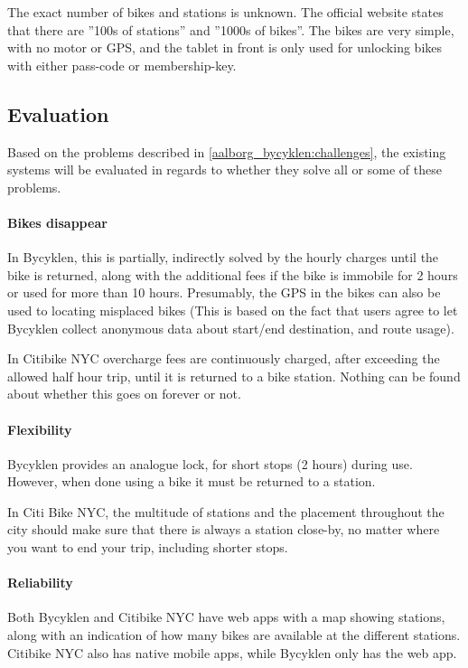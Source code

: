 The exact number of bikes and stations is unknown.
The official website states that there are ''100s of stations'' and ''1000s of bikes''\cite{nyc_citibike}.
The bikes are very simple, with no motor or GPS, and the tablet in front is only used for unlocking bikes with either pass-code or membership-key.

\subsection{Evaluation}
Based on the problems described in \cref{aalborg_bycyklen:challenges}, the existing systems will be evaluated in regards to whether they solve all or some of these problems.

\paragraph{Bikes disappear}
In Bycyklen, this is partially, indirectly solved by the hourly charges until the bike is returned, along with the additional fees if the bike is immobile for 2 hours or used for more than 10 hours.
Presumably, the GPS in the bikes can also be used to locating misplaced bikes (This is based on the fact that users agree to let Bycyklen collect anonymous data about start/end destination, and route usage).

In Citibike NYC overcharge fees are continuously charged, after exceeding the allowed half hour trip, until it is returned to a bike station.
Nothing can be found about whether this goes on forever or not.

\paragraph{Flexibility}
Bycyklen provides an analogue lock, for short stops (2 hours) during use.
However, when done using a bike it must be returned to a station.

In Citi Bike NYC, the multitude of stations and the placement throughout the city should make sure that there is always a station close-by, no matter where you want to end your trip, including shorter stops.

\paragraph{Reliability}
Both Bycyklen and Citibike NYC have web apps with a map showing stations, along with an indication of how many bikes are available at the different stations.
Citibike NYC also has native mobile apps, while Bycyklen only has the web app.

